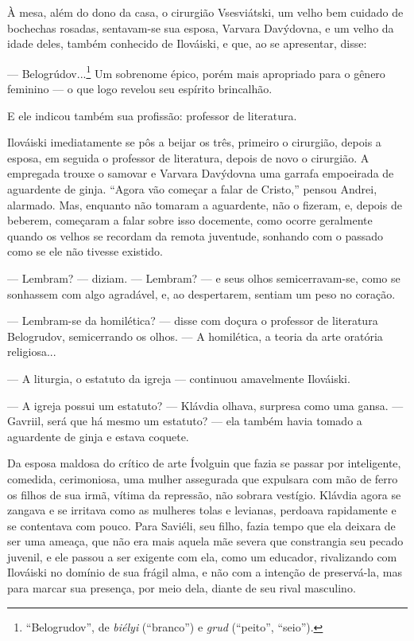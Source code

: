 À mesa, além do dono da casa, o cirurgião Vsesviátski, um velho bem
cuidado de bochechas rosadas, sentavam-se sua esposa, Varvara Davýdovna,
e um velho da idade deles, também conhecido de Ilováiski, e que, ao se
apresentar, disse:

--- Belogrúdov...\footnote{``Belogrudov'', de \emph{biélyi} (``branco'')
  e \emph{grud} (``peito'', ``seio'').} Um sobrenome épico, porém mais
apropriado para o gênero feminino --- o que logo revelou seu espírito
brincalhão.

E ele indicou também sua profissão: professor de literatura.

Ilováiski imediatamente se pôs a beijar os três, primeiro o cirurgião,
depois a esposa, em seguida o professor de literatura, depois de novo o
cirurgião. A empregada trouxe o samovar e Varvara Davýdovna uma garrafa
empoeirada de aguardente de ginja. ``Agora vão começar a falar de
Cristo,'' pensou Andrei, alarmado. Mas, enquanto não tomaram a
aguardente, não o fizeram, e, depois de beberem, começaram a falar sobre
isso docemente, como ocorre geralmente quando os velhos se recordam da
remota juventude, sonhando com o passado como se ele não tivesse
existido.

--- Lembram? --- diziam. --- Lembram? --- e seus olhos semicerravam-se,
como se sonhassem com algo agradável, e, ao despertarem, sentiam um peso
no coração.

--- Lembram-se da homilética? --- disse com doçura o professor de
literatura Belogrudov, semicerrando os olhos. --- A homilética, a teoria
da arte oratória religiosa...

--- A liturgia, o estatuto da igreja --- continuou amavelmente
Ilováiski.

--- A igreja possui um estatuto? --- Klávdia olhava, surpresa como uma
gansa. --- Gavriil, será que há mesmo um estatuto? --- ela também havia
tomado a aguardente de ginja e estava coquete.

Da esposa maldosa do crítico de arte Ívolguin que fazia se passar por
inteligente, comedida, cerimoniosa, uma mulher assegurada que expulsara
com mão de ferro os filhos de sua irmã, vítima da repressão, não sobrara
vestígio. Klávdia agora se zangava e se irritava como as mulheres tolas
e levianas, perdoava rapidamente e se contentava com pouco. Para
Saviéli, seu filho, fazia tempo que ela deixara de ser uma ameaça, que
não era mais aquela mãe severa que constrangia seu pecado juvenil, e ele
passou a ser exigente com ela, como um educador, rivalizando com
Ilováiski no domínio de sua frágil alma, e não com a intenção de
preservá-la, mas para marcar sua presença, por meio dela, diante de seu
rival masculino.

